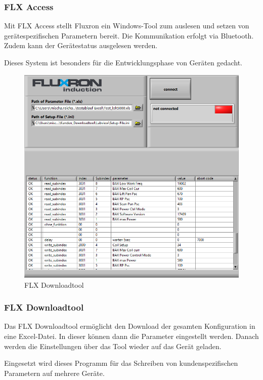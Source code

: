 \subsubsection{FLX Access}
\label{subsubsec:FLX Access}

Mit FLX Access stellt Fluxron ein Windows-Tool zum auslesen und setzen von gerätespezifischen Parametern bereit. Die Kommunikation erfolgt via Bluetooth. Zudem kann der Gerätestatus ausgelesen werden. 

Dieses System ist besonders für die Entwicklungsphase von Geräten gedacht.

\vspace{2cm}
\WFclear
\begin{figure}
	\includegraphics[scale=0.25]{analysis/res/flxdltool}
	\caption{FLX Downloadtool}
\end{figure}

\subsubsection{FLX Downloadtool}
\label{subsubsec:FLX Downloadtool}

Das FLX Downloadtool ermöglicht den Download der gesamten Konfiguration in eine Excel-Datei. In dieser können dann die Parameter eingestellt werden. Danach werden die Einstellungen über das Tool wieder auf das Gerät geladen.

Eingesetzt wird dieses Programm für das Schreiben von kundenspezifischen Parametern auf mehrere Geräte.
\WFclear